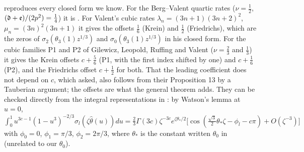  reproduces every closed form we know. For the Berg--Valent quartic
rates ($\nu=\frac12$, $(\mathfrak d+\mathfrak e)/(2p^2)=\frac14$) it is . For Valent's cubic rates
$\lambda_n=(3n+1)(3n+2)^2$, $\mu_n=(3n)^2(3n+1)$ \cite[Prop.~1]{Valent1999} it gives the offsets
$\frac16$ (Krein) and $\frac12$ (Friedrichs), which are the zeros of
$\sigma_2(\theta_3(1)z^{1/3})$ and $\sigma_0(\theta_3(1)z^{1/3})$ in his closed form. For the
cubic families P1 and P2 of Gilewicz, Leopold, Ruffing and Valent \cite{GLRV2006}
($\nu=\frac23$ and $\frac13$) it gives the Krein offsets $c+\frac56$ (P1, with the first index
shifted by one) and $c+\frac16$ (P2), and the Friedrichs offset $c+\frac12$ for both. That the
leading coefficient does not depend on $c$, which \cite[Remark 3]{GLRV2006} asked, also
follows from their Proposition 13 by a Tauberian argument; the offsets are what the
general theorem adds. They can be checked directly from the integral representations
in \cite[Props.~8 and 10]{GLRV2006}: by Watson's lemma at $u=0$,
$\int_0^1u^{3c-1}(1-u^3)^{-2/3}\sigma_l(\zeta\hat\theta(u))du
=\frac23\Gamma(3c)\zeta^{-3c}e^{\zeta\theta_*/2}\bigl[\cos(\frac{\sqrt3}{2}\theta_*\zeta-\phi_l-c\pi)+O(\zeta^{-3})\bigr]$
with $\phi_0=0$, $\phi_1=\pi/3$, $\phi_2=2\pi/3$, where $\theta_*$ is the constant written $\theta_0$
in \cite{GLRV2006} (unrelated to our $\theta_0$).
